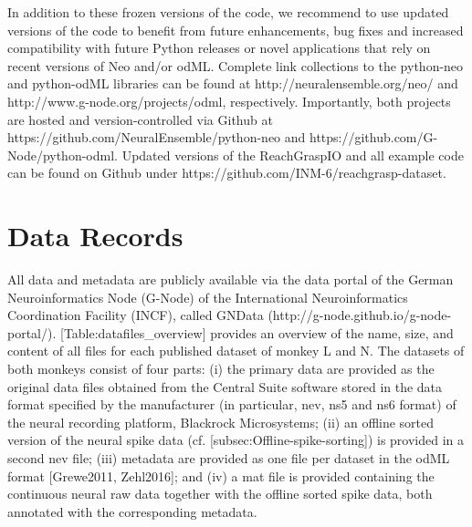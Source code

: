 {In addition to these frozen versions of the code, we recommend to use updated versions of the code to benefit from future enhancements, bug fixes and increased compatibility with future Python releases or novel applications that rely on recent versions of Neo and/or odML. Complete link collections to the python-neo and python-odML libraries can be found at http://neuralensemble.org/neo/ and http://www.g-node.org/projects/odml, respectively. Importantly, both projects are hosted and version-controlled via Github at https://github.com/NeuralEnsemble/python-neo and https://github.com/G-Node/python-odml. Updated versions of the ReachGraspIO and all example code can be found on Github under https://github.com/INM-6/reachgrasp-dataset.

\section{Data Records}

All data and metadata are publicly available via the data portal of the German Neuroinformatics Node (G-Node) of the International Neuroinformatics Coordination Facility (INCF), called GNData (http://g-node.github.io/g-node-portal/). [Table:datafiles\_overview] provides an overview of the name, size, and content of all files for each published dataset of monkey L and N. The datasets of both monkeys consist of four parts: (i) the primary data are provided as the original data files obtained from the Central Suite software stored in the data format specified by the manufacturer (in particular, nev, ns5 and ns6 format) of the neural recording platform, Blackrock Microsystems; (ii) an offline sorted version of the neural spike data (cf. [subsec:Offline-spike-sorting]) is provided in a second nev file; (iii) metadata are provided as one file per dataset in the odML format [Grewe2011, Zehl2016]; and (iv) a mat file is provided containing the continuous neural raw data together with the offline sorted spike data, both annotated with the corresponding metadata.

}
